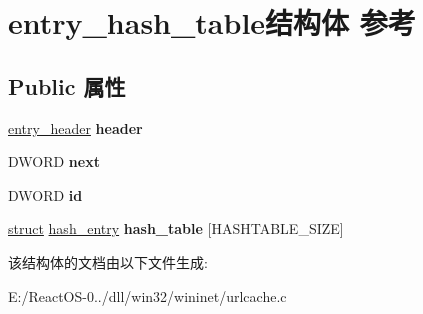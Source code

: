 \hypertarget{structentry__hash__table}{}\section{entry\+\_\+hash\+\_\+table结构体 参考}
\label{structentry__hash__table}
\subsection*{Public 属性}
\begin{DoxyCompactItemize}
\item 
\mbox{\label{structentry__hash__table_a9d118bd7f1a41fc51e58ad936bd7d961}} 
\hyperlink{structentry__header}{entry\+\_\+header} {\bfseries header}
\item 
\mbox{\label{structentry__hash__table_a2e7f4ead5c55ee03a4f3018a3d71531a}} 
D\+W\+O\+RD {\bfseries next}
\item 
\mbox{\label{structentry__hash__table_a29a8041d89f9d03a390adb0ac326abdf}} 
D\+W\+O\+RD {\bfseries id}
\item 
\mbox{\label{structentry__hash__table_acc356798a72aeef2b63791a1fceffc23}} 
\hyperlink{interfacestruct}{struct} \hyperlink{structhash__entry}{hash\+\_\+entry} {\bfseries hash\+\_\+table} \mbox{[}H\+A\+S\+H\+T\+A\+B\+L\+E\+\_\+\+S\+I\+ZE\mbox{]}
\end{DoxyCompactItemize}


该结构体的文档由以下文件生成\+:\begin{DoxyCompactItemize}
\item 
E\+:/\+React\+O\+S-\/0../dll/win32/wininet/urlcache.\+c\end{DoxyCompactItemize}
